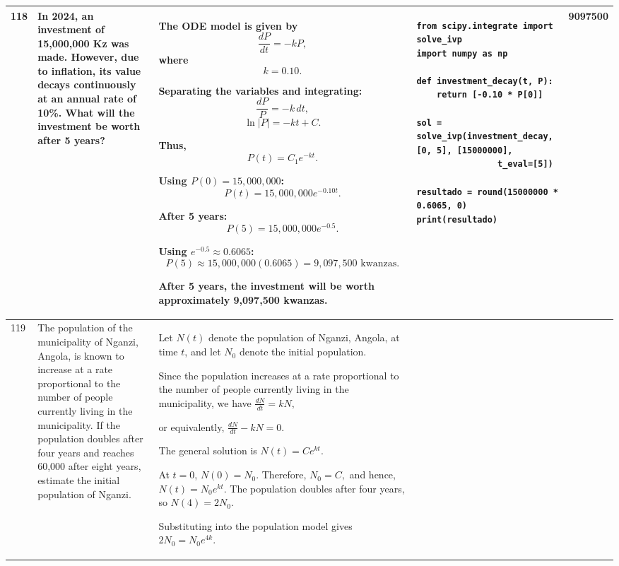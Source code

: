 \documentclass[a4paper,12pt]{article}
\begin{document}
\begin{longtable}{|p{0.3cm}|p{}|p{10cm}|p{}|p{1.5cm}|}
118 & In 2024, an investment of 15,000,000 Kz was made. However, due to inflation, its value decays continuously at an annual rate of 10\%. What will the investment be worth after 5 years? &
The ODE model is given by
\[
\frac{dP}{dt}=-kP,
\]
where
\[
k=0.10.
\]

Separating the variables and integrating:
\[
\frac{dP}{P}=-k\,dt,
\]
\[
\ln|P|=-kt+C.
\]

Thus,
\[
P(t)=C_1e^{-kt}.
\]

Using \(P(0)=15,000,000\):
\[
P(t)=15,000,000e^{-0.10t}.
\]

After 5 years:
\[
P(5)=15,000,000e^{-0.5}.
\]

Using \(e^{-0.5}\approx0.6065\):
\[
P(5)\approx15,000,000(0.6065)
=9,097,500\text{ kwanzas}.
\]

After 5 years, the investment will be worth approximately 9,097,500 kwanzas. &
\begin{verbatim}
from scipy.integrate import solve_ivp
import numpy as np

def investment_decay(t, P):
    return [-0.10 * P[0]]

sol = solve_ivp(investment_decay, [0, 5], [15000000],
                t_eval=[5])

resultado = round(15000000 * 0.6065, 0)
print(resultado)
\end{verbatim}
& 9097500 \\ \hline
119 &The population of the municipality of Nganzi, Angola, is known to increase at a rate proportional to the number of people currently living in the municipality. If the population doubles after four years and reaches 60,000 after eight years, estimate the initial population of Nganzi.

&

Let \(N(t)\) denote the population of Nganzi, Angola, at time \(t\), and let \(N_0\) denote the initial population.

Since the population increases at a rate proportional to the number of people currently living in the municipality, we have $
\frac{dN}{dt}=kN,
$

or equivalently, $
\frac{dN}{dt}-kN=0.
$

The general solution is  $
N(t)=Ce^{kt}.
$

At \(t=0\), \(N(0)=N_0\). Therefore, $
N_0=C,
$
and hence, $
N(t)=N_0e^{kt}.
$
The population doubles after four years, so  $
N(4)=2N_0.
$

Substituting into the population model gives $
2N_0=N_0e^{4k}.
$


\end{longtable}
\end{document}
